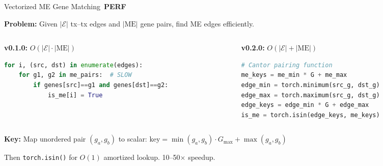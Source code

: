 \documentclass[aspectratio=169,10pt]{beamer}
\newcommand{\edges}{\mathcal{E}}
\newcommand{\PERF}{\,{\scriptsize\colorbox{coralaccent}{\color{white}\textbf{PERF}}}\,}
\begin{document}
\begin{frame}[fragile]{Vectorized ME Gene Matching \PERF}

\textbf{Problem:} Given $|\edges|$ tx--tx edges and $|\text{ME}|$ gene pairs, find ME edges efficiently.

\vspace{0.15cm}

\begin{columns}[T]
\begin{column}{0.48\textwidth}
\textbf{v0.1.0:} $O(|\edges| \cdot |\text{ME}|)$
\begin{lstlisting}[language=Python]
for i, (src, dst) in enumerate(edges):
    for g1, g2 in me_pairs:  # SLOW
        if genes[src]==g1 and genes[dst]==g2:
            is_me[i] = True
\end{lstlisting}
\end{column}

\begin{column}{0.48\textwidth}
\textbf{v0.2.0:} $O(|\edges| + |\text{ME}|)$
\begin{lstlisting}[language=Python]
# Cantor pairing function
me_keys = me_min * G + me_max
edge_min = torch.minimum(src_g, dst_g)
edge_max = torch.maximum(src_g, dst_g)
edge_keys = edge_min * G + edge_max
is_me = torch.isin(edge_keys, me_keys)
\end{lstlisting}
\end{column}
\end{columns}

\vspace{0.15cm}

{\small
\textbf{Key:} Map unordered pair $(g_a, g_b)$ to scalar: $\text{key} = \min(g_a, g_b) \cdot G_{\max} + \max(g_a, g_b)$

Then \texttt{torch.isin()} for $O(1)$ amortized lookup. \alert{10--50$\times$ speedup.}
}
\end{frame}
\end{document}
